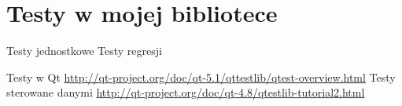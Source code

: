 \documentclass[11pt,twoside,a4paper,final]{article}
\begin{document}
\section{Testy w mojej bibliotece}
Testy jednostkowe
Testy regresji


\begin{thebibliography}{}

Testy w Qt \url{http://qt-project.org/doc/qt-5.1/qttestlib/qtest-overview.html}
Testy sterowane danymi \url{http://qt-project.org/doc/qt-4.8/qtestlib-tutorial2.html}


\end{thebibliography}
\end{document}
